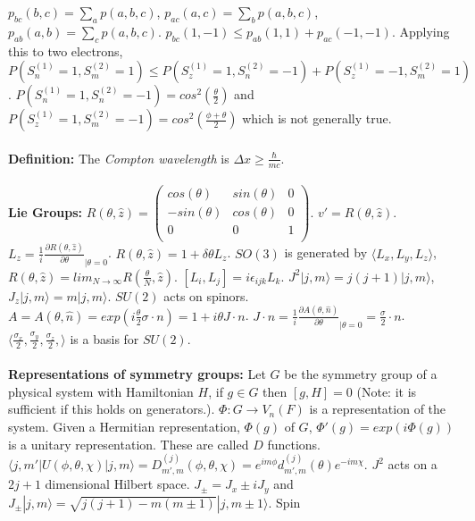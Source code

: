 $p_{bc}(b,c)= \sum_a p(a,b,c)$, $p_{ac}(a,c)= \sum_b p(a,b,c)$, $p_{ab}(a,b)= \sum_c p(a,b,c)$.
$ p_{bc}(1, -1) \leq p_{ab}(1, 1) + p_{ac}(-1, -1) $.  Applying this to two electrons,
$
P( S_n^{(1)}=1, S_m^{(2)}=1) \leq
P( S_z^{(1)}=1, S_n^{(2)}=-1)+
P( S_z^{(1)}=-1, S_m^{(2)}=1)
$.
$P( S_n^{(1)}=1, S_n^{(2)}=-1) = cos^2({\frac {\theta} 2})$ and
$ P( S_z^{(1)}=1, S_m^{(2)}=-1)= cos^2({\frac {\phi+\theta} 2}) $ which is not generally true.
\\
\\
{\bf Definition:}
The \emph{Compton wavelength} is  $\Delta x \geq {\frac {\hbar} {mc}}$.
\\
\\
{\bf Lie Groups:}
$R(\theta, \hat{z})=
\left(
\begin{array}{ccc}
cos(\theta) & sin(\theta) & 0\\
-sin(\theta) & cos(\theta) & 0\\
0 & 0 & 1\\
\end{array}
\right).$
$v'= R(\theta, \hat{z})$.  $L_z= {\frac 1 i} {\frac {\partial R(\theta, \hat{z})} {\partial \theta}}_{|\theta= 0}$.
$R(\theta, \hat{z})= 1 + \delta \theta L_z$.  $SO(3)$ is generated by 
$\langle L_x , L_y , L_z \rangle$, $R(\theta, \hat{z})=
lim_{N \rightarrow \infty} R({\frac {\theta} {N}}, \hat{z})$.  $[L_i, L_j]= i \epsilon_{ijk} L_k$.
$J^2 | j, m\rangle= j(j+1) |j, m \rangle$, $J_z |j,m\rangle= m |j, m \rangle$.  $SU(2)$ acts on spinors.
$A= A(\theta, \hat{n})= exp(i {\frac {\theta} 2} \sigma \cdot n)= 1+ i \theta J \cdot n$.  $J \cdot n=
{\frac 1 i} {\frac {\partial A(\theta, \hat{n})} {\partial \theta}}_{| \theta=0}= {\frac {\sigma} 2} \cdot n$.
$\langle {\frac {\sigma_x} 2}, {\frac {\sigma_y} 2}, {\frac {\sigma_z} 2}, \rangle$ is a basis for $SU(2)$.
\\
\\
{\bf Representations of symmetry groups:}  
Let $G$ be the symmetry group of a physical system with Hamiltonian $H$, if $g \in G$ then
$[g,H]=0$ (Note: it is sufficient if this holds on generators.).  
$\Phi: G \rightarrow V_n(F)$ is a representation of the system.  Given a Hermitian representation,
$\Phi(g)$ of $G$, $\Phi'(g)= exp(i \Phi(g))$ is a unitary representation.  These are called $D$ functions.  
$\langle j,m' | U(\phi, \theta, \chi ) | j, m \rangle= D^{(j)}_{m', m} (\phi, \theta, \chi)=
e^{im \phi} d^{(j)}_{m', m}(\theta) e^{-i m \chi}$.  $J^2$ acts on a $2j+1$ dimensional Hilbert space.
$J_{\pm}= J_x \pm i J_y$ and $J_{\pm} | j, m \rangle=
{\sqrt {j(j+1)-m(m \pm 1)}} | j, m \pm 1 \rangle$.  Spin
